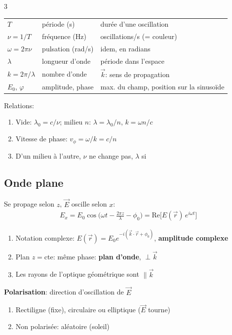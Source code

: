 \documentclass[12pt, a4paper]{article}
\newcommand{\ve}[1]{\vec{#1}}
\begin{document}
\begin{multicols*}{3}
	\begin{tabular}{|l|l|>{\raggedright\arraybackslash}p{3.1cm}|}
		\hline
		$T$              & période (s)       & durée d'une oscillation                  \\
		$\nu=1/T$        & fréquence (Hz)    & oscillations/s (= couleur)               \\
		$\omega=2\pi\nu$ & pulsation (rad/s) & idem, en radians                         \\
		$\lambda$        & longueur d'onde   & période dans l'espace                    \\
		$k=2\pi/\lambda$ & nombre d'onde     & $\ve k$: sens de propagation             \\
		$E_0$, $\varphi$ & amplitude, phase  & max. du champ, position sur la sinusoïde \\
		\hline
	\end{tabular}

	Relations:
	\begin{enumerate}[\roman*.]
		\item Vide: $\lambda_0=c/\nu$; milieu $n$: $\lambda=\lambda_0/n$, $k=\omega n/c$
		\item Vitesse de phase: $v_\phi=\omega/k=c/n$
		\item D'un milieu à l'autre, $\nu$ ne change pas, $\lambda$ si
	\end{enumerate}

	\subsection{Onde plane}
	Se propage selon $z$, $\ve E$ oscille selon $x$:
	\begin{gather*}
		E_x=E_0\cos\Big(\omega t-\frac{2\pi z}{\lambda}-\phi_0\Big)=\mathrm{Re}\big[E(\ve r)\,e^{i\omega t}\big]
	\end{gather*}
	\begin{enumerate}[\roman*.]
		\item Notation complexe: $E(\ve r)=E_0e^{-i(\ve k\cdot\ve r+\phi_0)}$, \textbf{amplitude complexe}
		\item Plan $z=$cte: même phase: \textbf{plan d'onde}, $\perp\ve k$
		\item Les rayons de l'optique géométrique sont $\parallel\ve k$
	\end{enumerate}

	\colbreak
	\textbf{Polarisation}: direction d'oscillation de $\ve E$
	\begin{enumerate}[\roman*.]
		\item Rectiligne (fixe), circulaire ou elliptique ($\ve E$ tourne)
		\item Non polarisée: aléatoire (soleil)
	\end{enumerate}


\end{multicols*}
\end{document}

